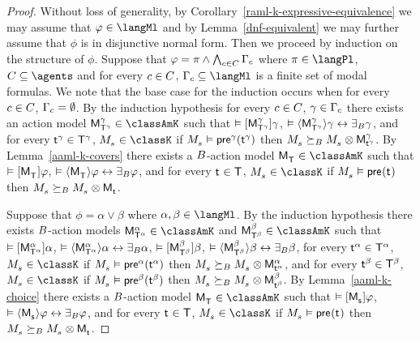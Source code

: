 \begin{proof}
Without loss of generality, by Corollary~\ref{raml-k-expressive-equivalence} we may assume that $\phi \in \langMl$ and by Lemma~\ref{dnf-equivalent} we may further assume that $\phi$ is in disjunctive normal form.
Then we proceed by induction on the structure of $\phi$.  
Suppose that $\phi = \pi \land \bigwedge_{\agentC \in \agentsC} \Gamma_\agentC$ where $\pi \in \langPl$, $\agentsC \subseteq \agents$ and for every $\agentC \in \agentsC$, $\Gamma_\agentC \subseteq \langMl$ is a finite set of modal formulas.
We note that the base case for the induction occurs when for every $\agentC \in \agentsC$, $\Gamma_\agentC = \emptyset$.
By the induction hypothesis for every $\agentC \in \agentsC$, $\gamma \in \Gamma_\agentC$ there exists 
an action model $\aPModel[\gamma]{\aStatesT[\gamma]} \in \classAmK$ such that
$\entails \actionA{\aPModel[\gamma]{\aStatesT[\gamma]}} \gamma$,
$\entails \actionE{\aPModel[\gamma]{\aStatesT[\gamma]}} \gamma \iff \someactsBs \gamma$, and
for every $\aStateT[\gamma] \in \aStatesT[\gamma]$, $\kPModel{\kStateS} \in \classK$ if $\kPModel{\kStateS} \entails \aPrecondition[\gamma](\aStateT[\gamma])$ then $\kPModel{\kStateS} \simulatesBs \kPModel{\kStateS} \exec \aPModel[\gamma]{\aStateT[\gamma]}$.
By Lemma~\ref{aaml-k-covers} there exists a $\agentsB$-action model $\aPModel{\aStatesT} \in \classAmK$ such that 
$\entails \actionA{\aPModel{\aStatesT}} \phi$,
$\entails \actionE{\aPModel{\aStatesT}} \phi \iff \someactsBs \phi$, and
for every $\aStateT \in \aStatesT$, $\kPModel{\kStateS} \in \classK$ if $\kPModel{\kStateS} \entails \aPrecondition(\aStateT)$ then $\kPModel{\kStateS} \simulatesBs \kPModel{\kStateS} \exec \aPModel{\aStateT}$.

Suppose that $\phi = \alpha \lor \beta$ where $\alpha, \beta \in \langMl$.
By the induction hypothesis there exists $\agentsB$-action models
$\aPModel[\alpha]{\aStatesT[\alpha]} \in \classAmK$ and $\aPModel[\beta]{\aStatesT[\beta]} \in \classAmK$ such that 
$\entails \actionA{\aPModel[\alpha]{\aStatesT[\alpha]}} \alpha$, 
$\entails \actionE{\aPModel[\alpha]{\aStatesT[\alpha]}} \alpha \iff \someactsBs \alpha$, 
$\entails \actionA{\aPModel[\beta]{\aStatesT[\beta]}} \beta$,
$\entails \actionE{\aPModel[\beta]{\aStatesT[\beta]}} \beta \iff \someactsBs \beta$,
for every $\aStateT[\alpha] \in \aStatesT[\alpha]$, $\kPModel{\kStateS} \in \classK$ if $\kPModel{\kStateS} \entails \aPrecondition[\alpha](\aStateT[\alpha])$ then $\kPModel{\kStateS} \simulatesBs \kPModel{\kStateS} \exec \aPModel[\alpha]{\aStateT[\alpha]}$, and
for every $\aStateT[\beta] \in \aStatesT[\beta]$, $\kPModel{\kStateS} \in \classK$ if $\kPModel{\kStateS} \entails \aPrecondition[\beta](\aStateT[\beta])$ then $\kPModel{\kStateS} \simulatesBs \kPModel{\kStateS} \exec \aPModel[\beta]{\aStateT[\beta]}$.
By Lemma~\ref{aaml-k-choice} there exists a $\agentsB$-action model $\aPModel{\aStatesT} \in \classAmK$ such that 
$\entails \actionA{\aPModel{\aStateS}} \phi$,
$\entails \actionE{\aPModel{\aStateS}} \phi \iff \someactsBs \phi$, and
for every $\aStateT \in \aStatesT$, $\kPModel{\kStateS} \in \classK$ if $\kPModel{\kStateS} \entails \aPrecondition(\aStateT)$ then $\kPModel{\kStateS} \simulatesBs \kPModel{\kStateS} \exec \aPModel{\aStateT}$.
\end{proof}

